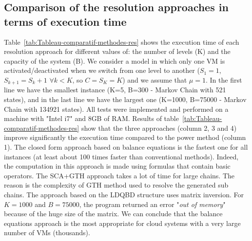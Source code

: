 \documentclass[conference]{IEEEtran}
\begin{document}
\subsection{Comparison of the resolution approaches in terms of execution time}
\label{AAA}
Table~\ref{tab:Tableau-comparatif-methodes-res} shows the execution time of each resolution approach for different values of: 
the number of levels (K) and the capacity of the system (B). We consider a model in which only one VM is activated/deactivated 
when we switch from one level to another ($S_1=1$, $S_{k+1}=S_{k}+1$ $\forall k<K$, so $C=S_{K}=K$) and we assume that $\mu=1$. In the first line we have the smallest 
instance (K=5, B=300 - Markov Chain with 521 states), and in the last line we have the largest one (K=1000, B=75000 - Markov Chain with 134921 states).
All tests were implemented and performed on a machine with "Intel i7" and 8GB of RAM. Results of table~\ref{tab:Tableau-comparatif-methodes-res} show that the three approaches (column 2, 3 and 4) improve significantly the execution time compared to the power method (column 1). The closed form approach based on balance equations is the fastest one for all instances (at least about 100 times faster than conventional methods). Indeed, the computation in this approach is made using formulas that contain basic operators. 
The SCA+GTH approach takes a lot of time for large chains. The reason is the complexity of GTH method used to resolve the generated sub chains. 
The approach based on the LDQBD structure uses matrix inversion. For $K = 1000$ and $B = 75000$, the program returned an error "\textit{out of memory}" 
because of the huge size of the matrix. 
We can conclude that the balance equations approach is the most appropriate for cloud systems with a very large number of VMs (thousands).
\end{document}
